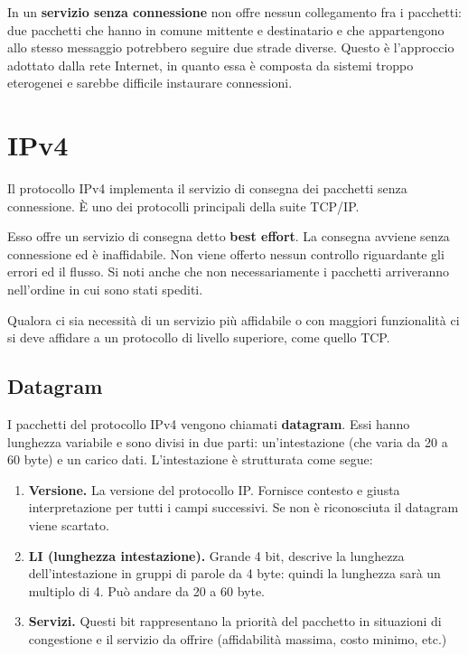         In un \textbf{servizio senza connessione} non offre nessun collegamento fra i pacchetti: due pacchetti che hanno in comune mittente e destinatario e che appartengono allo stesso messaggio potrebbero seguire due strade diverse. Questo è l'approccio adottato dalla rete Internet, in quanto essa è composta da sistemi troppo eterogenei e sarebbe difficile instaurare connessioni.
        
\section{IPv4}
    Il protocollo IPv4 implementa il servizio di consegna dei pacchetti senza connessione. È uno dei protocolli principali della suite TCP/IP.
    
    Esso offre un servizio di consegna detto \textbf{best effort}. La consegna avviene senza connessione ed è inaffidabile. Non viene offerto nessun controllo riguardante gli errori ed il flusso. Si noti anche che non necessariamente i pacchetti arriveranno nell'ordine in cui sono stati spediti.
    
    Qualora ci sia necessità di un servizio più affidabile o con maggiori funzionalità ci si deve affidare a un protocollo di livello superiore, come quello TCP.
    
    \subsection{Datagram}
        I pacchetti del protocollo IPv4 vengono chiamati \textbf{datagram}. Essi hanno lunghezza variabile e sono divisi in due parti: un'intestazione (che varia da 20 a 60 byte) e un carico dati. L'intestazione è strutturata come segue:
        \begin{enumerate}
            \item \textbf{Versione.} La versione del protocollo IP. Fornisce contesto e giusta interpretazione per tutti i campi successivi. Se non è riconosciuta il datagram viene scartato.
            
            \item \textbf{LI (lunghezza intestazione).} Grande 4 bit, descrive la lunghezza dell'intestazione in gruppi di parole da 4 byte: quindi la lunghezza sarà un multiplo di 4. Può andare da 20 a 60 byte.
            
            \item \textbf{Servizi.} Questi bit rappresentano la priorità del pacchetto in situazioni di congestione e il servizio da offrire (affidabilità massima, costo minimo, etc.)
        \end{enumerate}
        
